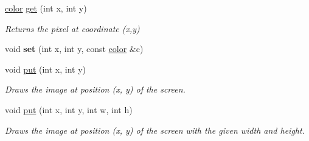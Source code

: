 \begin{DoxyCompactItemize}
\item 
\hypertarget{classcprocessing_1_1PImage_ab961583f0c5c97e747a14e85900548de}{\hyperlink{classcprocessing_1_1color}{color} \hyperlink{classcprocessing_1_1PImage_ab961583f0c5c97e747a14e85900548de}{get} (int x, int y)}\label{classcprocessing_1_1PImage_ab961583f0c5c97e747a14e85900548de}

\begin{DoxyCompactList}\small\item\em \-Returns the pixel at coordinate (x,y) \end{DoxyCompactList}\item 
\hypertarget{classcprocessing_1_1PImage_ab624a6c5478a9f4ba17ec985333c6a3f}{void {\bfseries set} (int x, int y, const \hyperlink{classcprocessing_1_1color}{color} \&c)}\label{classcprocessing_1_1PImage_ab624a6c5478a9f4ba17ec985333c6a3f}

\item 
\hypertarget{classcprocessing_1_1PImage_a2b3e8502a8d0dc519d867e8eed5d9c3e}{void \hyperlink{classcprocessing_1_1PImage_a2b3e8502a8d0dc519d867e8eed5d9c3e}{put} (int x, int y)}\label{classcprocessing_1_1PImage_a2b3e8502a8d0dc519d867e8eed5d9c3e}

\begin{DoxyCompactList}\small\item\em \-Draws the image at position (x, y) of the screen. \end{DoxyCompactList}\item 
void \hyperlink{classcprocessing_1_1PImage_a5270bb1a528eeeaf8fabccf9243c3feb}{put} (int x, int y, int w, int h)
\begin{DoxyCompactList}\small\item\em \-Draws the image at position (x, y) of the screen with the given width and height. \end{DoxyCompactList}\end{DoxyCompactItemize}
